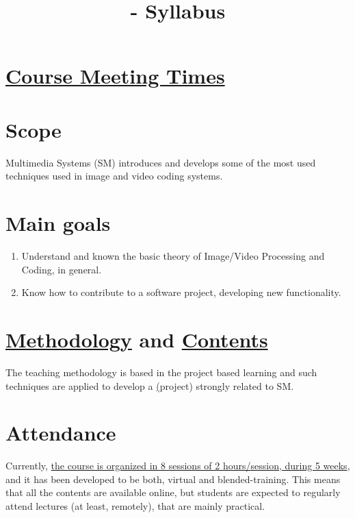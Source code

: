 

\title{\SM{} - Syllabus}

\maketitle

\section{\href{https://www.ual.es/estudios/masteres/presentacion/plandeestudios/asignatura/7114/71142105}{Course Meeting Times}}

\section{Scope}
Multimedia Systems (SM) introduces and develops some of the most used techniques used in image and video coding systems.

\section{Main goals}
\begin{enumerate}
\item Understand and known the basic theory of Image/Video Processing and Coding, in general.
\item Know how to contribute to a software project, developing new functionality.
\end{enumerate}

\section{\href{http://portafirma.ual.es/pfirma/downloadReport/file?idDocument=4u61Ie5es2&idRequest=ZeBY35LlFa}{Methodology} and \href{https://sistemas-multimedia.github.io/contents/}{Contents}}
The teaching methodology is based in the project based learning and
such techniques are applied to develop a
\href{https://github.com/Sistemas-Multimedia/VCF}(project) strongly
related to SM.

\section{Attendance}
Currently,
\href{https://www.ual.es/estudios/masteres/presentacion/plandeestudios/asignatura/7114/71142105}{the
  course is organized in 8 sessions of 2 hours/session, during 5
  weeks}, and it has been developed to be both, virtual and
blended-training. This means that all the contents are available
online, but students are expected to regularly attend lectures (at
least, remotely), that are mainly practical.

